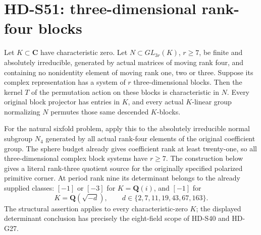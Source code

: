 \section{HD-S51: three-dimensional rank-four blocks}
\label{sec:three-block-rank-four-scope}

Let \(K\subset\mathbf C\) have characteristic zero. Let
\(N\subset GL_{3r}(K)\), \(r\ge7\), be finite and absolutely
irreducible, generated by actual matrices of moving rank four,
and containing no nonidentity element of moving rank one, two
or three. Suppose its complex representation has a system of
\(r\) three-dimensional blocks. Then the kernel \(T\) of the
permutation action on these blocks is characteristic in \(N\).
Every original block projector has entries in \(K\), and every
actual \(K\)-linear group normalizing \(N\) permutes those
same descended \(K\)-blocks.

For the natural sixfold problem, apply this to the absolutely
irreducible normal subgroup \(N_4\) generated by all actual
rank-four elements of the original coefficient group. The
sphere budget already gives coefficient rank at least twenty-one,
so all three-dimensional complex block systems have \(r\ge7\).
The construction below gives a literal rank-three quotient source
for the originally specified polarized primitive corner. At period
rank nine its determinant belongs to the already supplied classes:
\([-1]\) or \([-3]\) for \(K=\mathbf Q(i)\), and \([-1]\)
for
\[
 K=\mathbf Q(\sqrt{-d}),\qquad
 d\in\{2,7,11,19,43,67,163\}.                         \tag{S51.1}
\]
The structural assertion applies to every characteristic-zero
\(K\); the displayed determinant conclusion has precisely the
eight-field scope of HD-S40 and HD-G27.

